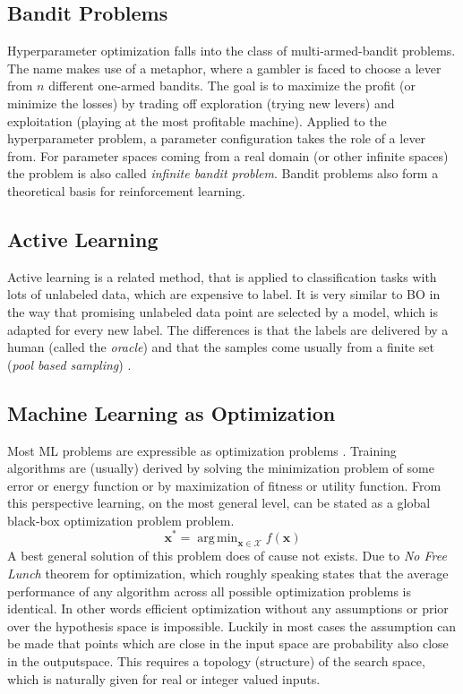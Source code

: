 \documentclass[english]{article}
\newcommand{\x}{\mathbf{x}}
\DeclareMathOperator*{\argmin}{arg\,min}
\begin{document}
\subsection{Bandit Problems}
Hyperparameter optimization falls into the class of multi-armed-bandit problems. The name makes use of a metaphor, where a gambler is faced to choose a lever from $n$ different one-armed bandits. The goal is to maximize the profit (or minimize the losses) by trading off exploration (trying new levers) and exploitation (playing at the most profitable machine). Applied to the hyperparameter problem, a parameter configuration takes the role of a lever from. For parameter spaces coming from a real domain (or other infinite spaces) the problem is also called \textit{infinite bandit problem}. Bandit problems also form a theoretical basis for reinforcement learning.



\subsection{Active Learning}
Active learning is a related method, that is applied to classification tasks with lots of unlabeled data, which are expensive to label. It is very similar to BO in the way that promising unlabeled data point are selected by a model, which is adapted for every new label. The differences is that the labels are delivered by a human (called the \textit{oracle}) and that the samples come usually from a finite set (\textit{pool based sampling}) \cite{settles_active_2010}.

\subsection{Machine Learning as Optimization}
Most ML problems are expressible as optimization problems \cite{bennett_interplay_2006}. Training algorithms are (usually) derived by solving the minimization problem of some error or energy function or by maximization of fitness or utility function. From this perspective learning, on the most general level, can be stated as a global black-box optimization problem problem.
$$\x^* = \argmin_{\x \in \mathcal{X}} f(\x)$$
A best general solution of this problem does of cause not exists. Due to \textit{No Free Lunch} theorem for optimization, which roughly speaking states that the average performance of any algorithm across all possible optimization problems is identical. In other words efficient optimization without any assumptions or prior over the hypothesis space is impossible. Luckily in most cases the assumption can be made that points which are close in the input space are probability also close in the outputspace. This requires a topology (structure) of the search space, which is naturally given for real or integer valued inputs.
\end{document}
